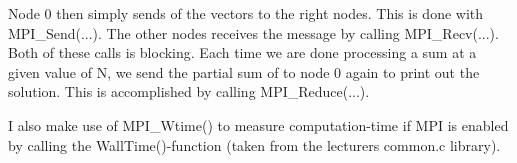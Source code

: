 \documentclass{article}
\begin{document}
Node 0 then simply sends of the vectors to the right nodes. This is done with MPI\_Send(...). The other nodes receives the message by calling MPI\_Recv(...). Both of these calls is blocking. Each time we are done processing a sum at a given value of N, we send the partial sum of to node 0 again to print out the solution. This is accomplished by calling MPI\_Reduce(...).    

I also make use of MPI\_Wtime() to measure computation-time if MPI is enabled by calling the WallTime()-function (taken from the lecturers common.c library). \\ \\
\end{document}

